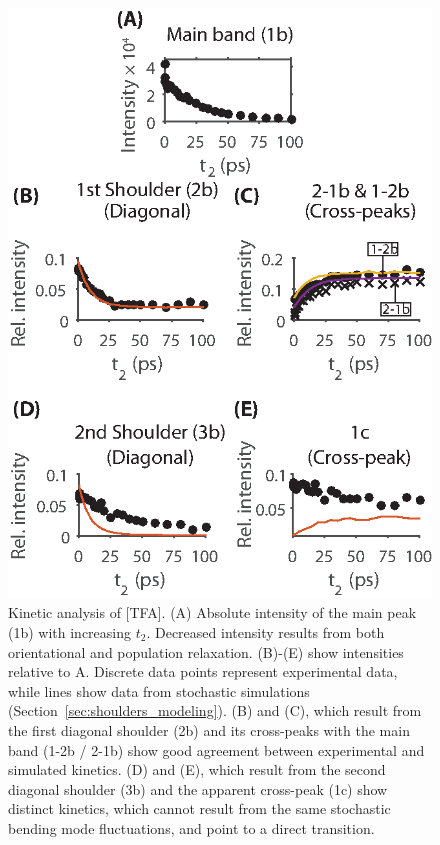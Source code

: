 \documentclass[%
  class = book,%
  crop = false,%
  float = true,%
  multi = true,%
  preview = false,%
]{standalone}
\begin{document}
{\begin{figure}
  \centering
  \includegraphics[scale=1]{fig6.eps}
  \caption[\texorpdfstring{}{Carbon dioxide} in IL bending mode kinetics]{\label{fig:shoulder kinetics}Kinetic analysis of \ce{[Im_{4,1}]}[TFA]. (A) Absolute intensity of the main peak (1b) with increasing \(t_2\). Decreased intensity results from both orientational and population relaxation. (B)-(E) show intensities relative to A. Discrete data points represent experimental data, while lines show data from stochastic simulations (Section~\ref{sec:shoulders_modeling}). (B) and (C), which result from the first diagonal shoulder (2b) and its cross-peaks with the main band (1-2b / 2-1b) show good agreement between experimental and simulated kinetics. (D) and (E), which result from the second diagonal shoulder (3b) and the apparent cross-peak (1c) show distinct kinetics, which cannot result from the same stochastic bending mode fluctuations, and point to a direct transition.}
\end{figure}

}
\end{document}
